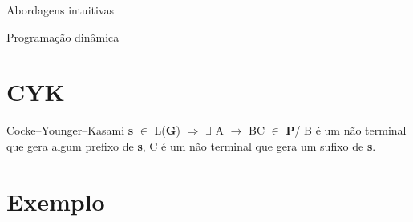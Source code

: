 \documentclass[size=14pt,
style=paintings
]{powerdot}
\begin{document}
\begin{slide}{Abordagens intuitivas}
\vspace{2cm}
{
}
\end{slide}
\begin{slide}{Programação dinâmica}
\vspace{1.5cm}
{


}
\end{slide}
\section{CYK}
\begin{slide}{Cocke–Younger–Kasami}
\vspace{1cm}
\textbf{s} $\in$ L(\textbf{G}) $\Rightarrow$ $\exists$ A $\rightarrow$ BC $\in$ \textbf{P}/ B é um não terminal que gera algum prefixo de \textbf{s}, C é um não terminal que gera um sufixo de \textbf{s}.
\vspace{1.5cm}
\begin{center}
\end{center}

\end{slide}
\section{Exemplo}
\end{document}
